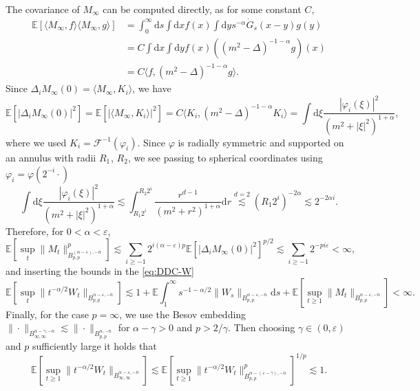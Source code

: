 \documentclass[11pt, a4paper]{scrartcl}
\numberwithin{equation}{section}
\theoremstyle{plain}
\theoremstyle{remark}
\newcommand{\mathd}{\mathrm{d}}
\begin{document}
The covariance of $M_{\infty}$ can be computed directly, as for some constant
$C$,
\[ \begin{aligned}
     \mathbb{E} [\langle M_{\infty}, f \rangle \langle M_{\infty}, g \rangle]
     &= \int_0^{\infty} \mathd s \int \mathd x f (x) \int \mathd y s^{-
     \alpha} \dot{G}_s (x - y) g (y)\\
     &= C \int \mathd x \int \mathd y f (x) ((m^2 - \Delta)^{- 1 - \alpha}
     g) (x)\\
     &= C \langle f, (m^2 - \Delta)^{- 1 - \alpha} g \rangle .
   \end{aligned} \]
Since $\Delta_i M_{\infty} (0) = \langle M_{\infty}, K_i \rangle$, we have
\[ \mathbb{E} [| \Delta_i M_{\infty} (0) |^2] =\mathbb{E} [| \langle
   M_{\infty}, K_i \rangle |^2] = C \langle K_i, (m^2 - \Delta)^{- 1 - \alpha}
   K_i \rangle = \int \mathd \xi \frac{| \varphi_i (\xi) |^2}{(m^2 + | \xi
   |^2)^{1 + \alpha}}, \]
where we used $K_i = \mathcal{F}^{- 1} (\varphi_i)$. Since $\varphi$ is
radially symmetric and supported on an annulus with radii ${R_1}_{}$, $R_2$,
we see passing to spherical coordinates using $\varphi_i = \varphi (2^{- i}
\cdot)$
\[ \int \mathd \xi \frac{| \varphi_i (\xi) |^2}{(m^2 + | \xi |^2)^{1 +
   \alpha}} \lesssim \int_{R_1  2^i}^{R_2 2^i} \frac{r^{d - 1}}{(m^2 + r^2)^{1
   + \alpha}} \mathd r \overset{d = 2}{\lesssim} (R_1 2^i)^{- 2 \alpha}
   \lesssim 2^{- 2 \alpha i} . \]
Therefore, for $0 < \alpha < \varepsilon$,
\[ \mathbb{E} [\sup_t \| M_t \|^p_{B^{(\alpha - \varepsilon), - n}_{p, p}}]
   \lesssim \sum_{i \geqslant - 1} 2^{i (\alpha - \varepsilon) p} \mathbb{E}
   [| \Delta_i M_{\infty} (0) |^2]^{p / 2} \lesssim \sum_{i \geqslant - 1}
   2^{- pi \varepsilon} < \infty, \]
and inserting the bounds in the \eqref{eq:DDC-W}
{\small\[ \mathbb{E} [\sup_t  \| t^{- \alpha / 2} W_t \|_{B_{p, p}^{\alpha -
   \varepsilon, - n}}] \lesssim 1 +\mathbb{E} \int_1^{\infty} s^{- 1 - \alpha
   / 2} \| W_s \|_{B_{p, p}^{\alpha - \varepsilon, - n}} \mathd s +\mathbb{E}
   [\sup_{t \geqslant 1} \| M_t \|_{B_{p, p}^{\alpha - \varepsilon, - n}}] < \infty . \]}
Finally, for the case $p = \infty$, we use the Besov embedding $\| \cdot
\|_{B^{\alpha - \gamma, - n}_{\infty, \infty}} \lesssim \| \cdot \|_{B_{p,
p}^{\alpha, - n}}$ for $\alpha - \gamma > 0$ and $p > 2 / \gamma$. Then
choosing $\gamma \in (0, \varepsilon)$ and $p$ sufficiently large it holds
that
\[ \mathbb{E} [\sup_{t \geqslant 1} \| t^{- \alpha / 2} W_t
   \|_{B_{\infty, \infty}^{\alpha - \varepsilon, - n}}] \lesssim
   \mathbb{E} [\sup_{t \geqslant 1}  \| t^{- \alpha / 2} W_t \|_{B_{p,
   p}^{\alpha - (\varepsilon - \gamma), - n}}^p]^{1 / p} \lesssim 1. \]
\end{document}
